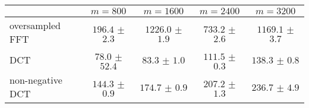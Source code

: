 \centering
\renewcommand{\arraystretch}{1.2}
\begin{tabular}{@{}lcccc@{}}
\toprule
 & $m=800$ & $m=1600$ & $m=2400$ & $m=3200$\\
\midrule
oversampled FFT & $196.4$ $\pm$ $2.3$ & $1226.0$ $\pm$ $1.9$ & $733.2$ $\pm$ $2.6$ & $1169.1$ $\pm$ $3.7$ \\
DCT & $78.0$ $\pm$ $52.4$ & $83.3$ $\pm$ $1.0$ & $111.5$ $\pm$ $0.3$ & $138.3$ $\pm$ $0.8$ \\
non-negative DCT & $144.3$ $\pm$ $0.9$ & $174.7$ $\pm$ $0.9$ & $207.2$ $\pm$ $1.3$ & $236.7$ $\pm$ $4.9$ \\
\bottomrule
\end{tabular}
